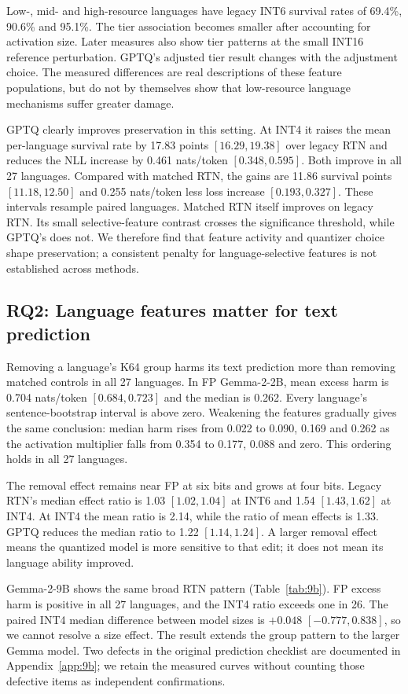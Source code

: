 \documentclass[11pt]{article}
\begin{document}
Low-, mid- and high-resource languages have legacy INT6 survival rates of 69.4\%, 90.6\% and 95.1\%. The tier association becomes smaller after accounting for activation size. Later measures also show tier patterns at the small INT16 reference perturbation. GPTQ's adjusted tier result changes with the adjustment choice. The measured differences are real descriptions of these feature populations, but do not by themselves show that low-resource language mechanisms suffer greater damage.

GPTQ clearly improves preservation in this setting. At INT4 it raises the mean per-language survival rate by 17.83 points $[16.29,19.38]$ over legacy RTN and reduces the NLL increase by 0.461 nats/token $[0.348,0.595]$. Both improve in all 27 languages. Compared with matched RTN, the gains are 11.86 survival points $[11.18,12.50]$ and 0.255 nats/token less loss increase $[0.193,0.327]$. These intervals resample paired languages. Matched RTN itself improves on legacy RTN. Its small selective-feature contrast crosses the significance threshold, while GPTQ's does not. We therefore find that feature activity and quantizer choice shape preservation; a consistent penalty for language-selective features is not established across methods.

\subsection{RQ2: Language features matter for text prediction}
Removing a language's K64 group harms its text prediction more than removing matched controls in all 27 languages. In FP Gemma-2-2B, mean excess harm is 0.704 nats/token $[0.684,0.723]$ and the median is 0.262. Every language's sentence-bootstrap interval is above zero. Weakening the features gradually gives the same conclusion: median harm rises from 0.022 to 0.090, 0.169 and 0.262 as the activation multiplier falls from 0.354 to 0.177, 0.088 and zero. This ordering holds in all 27 languages.

The removal effect remains near FP at six bits and grows at four bits. Legacy RTN's median effect ratio is 1.03 $[1.02,1.04]$ at INT6 and 1.54 $[1.43,1.62]$ at INT4. At INT4 the mean ratio is 2.14, while the ratio of mean effects is 1.33. GPTQ reduces the median ratio to 1.22 $[1.14,1.24]$. A larger removal effect means the quantized model is more sensitive to that edit; it does not mean its language ability improved.

Gemma-2-9B shows the same broad RTN pattern (Table~\ref{tab:9b}). FP excess harm is positive in all 27 languages, and the INT4 ratio exceeds one in 26. The paired INT4 median difference between model sizes is $+0.048$ $[-0.777,0.838]$, so we cannot resolve a size effect. The result extends the group pattern to the larger Gemma model. Two defects in the original prediction checklist are documented in Appendix~\ref{app:9b}; we retain the measured curves without counting those defective items as independent confirmations.
\end{document}
